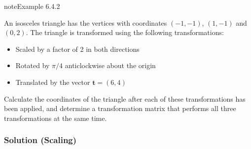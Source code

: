 \documentclass[letterpaper,10pt,english]{jupyterBook}
\begin{document}
\begin{sphinxadmonition}{note}{Example 6.4.2}



\sphinxAtStartPar
An isosceles triangle has the vertices with co\sphinxhyphen{}ordinates \((-1,-1)\), \((1,-1)\) and \((0,2)\). The triangle is transformed using the following transformations:
\begin{itemize}
\item {} 
\sphinxAtStartPar
Scaled by a factor of 2 in both directions

\item {} 
\sphinxAtStartPar
Rotated by \(\pi/4\) anti\sphinxhyphen{}clockwise about the origin

\item {} 
\sphinxAtStartPar
Translated by the vector \(\mathbf{t} = (6,4)\)

\end{itemize}

\sphinxAtStartPar
Calculate the co\sphinxhyphen{}ordinates of the triangle after each of these transformations has been applied, and determine a transformation matrix that performs all three transformations at the same time.
\subsubsection*{Solution (Scaling)}


\end{sphinxadmonition}
\end{document}
